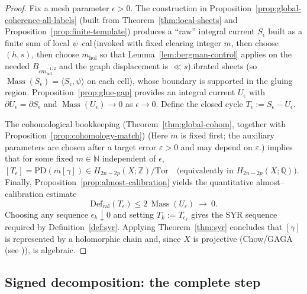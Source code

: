 \documentclass[11pt]{article}
\newcommand{\REV}[1]{\textcolor{blue}{#1}}
\numberwithin{equation}{section}  %
\theoremstyle{plain}
\theoremstyle{definition}
\theoremstyle{remark}
\newcommand{\Z}{\mathbb{Z}}
\newcommand{\Q}{\mathbb{Q}}
\newcommand{\N}{\mathbb{N}}
\newcommand{\mhol}{m_{\mathrm{hol}}} %
\DeclareMathOperator{\Mass}{Mass}
\newcommand{\Def}{\mathrm{Def}}
\begin{document}
\begin{proof}
Fix a mesh parameter $\epsilon>0$.
The construction in Proposition~\ref{prop:global-coherence-all-labels} (built from Theorem~\ref{thm:local-sheets} and Proposition~\ref{prop:finite-template}) produces a ``raw'' integral current $S_\epsilon$
built as a finite sum of local $\psi$--cal{\,(invoked with fixed clearing integer $m$, then choose $(h,s)$, then choose $\mhol$ so that Lemma~\ref{lem:bergman-control} applies on the needed $B_{c\mhol^{-1/2}}$ and the graph displacement is $\ll s$).}ibrated sheets (so $\Mass(S_\epsilon)=\langle S_\epsilon,\psi\rangle$ on each cell),
whose boundary is supported in the gluing region.
Proposition~\ref{prop:glue-gap} provides an integral current $U_\epsilon$ with
\(
\partial U_\epsilon=\partial S_\epsilon
\)
and
\(
\Mass(U_\epsilon)\to 0
\)
as $\epsilon\to 0$.
Define the closed cycle
\(
T_\epsilon:=S_\epsilon-U_\epsilon.
\)

The cohomological bookkeeping (Theorem~\ref{thm:global-cohom}, together with Proposition~\ref{prop:cohomology-match})
(Here $m$ is fixed first; the auxiliary parameters are chosen after a target error $\varepsilon>0$ and may depend on $\varepsilon$.)
implies that for some fixed $m\in\N$ independent of $\epsilon$,
\(
[T_\epsilon]=\mathrm{PD}(m[\gamma])\in H_{2n-2p}(X;\Z)/\mathrm{Tor}\quad\text{(equivalently in }H_{2n-2p}(X;\Q)\text{)}.
\)
Finally, Proposition~\ref{prop:almost-calibration} yields the quantitative almost--calibration estimate
\[
\Def_{\mathrm{cal}}(T_\epsilon)\le 2\,\Mass(U_\epsilon)\ \longrightarrow\ 0.
\]
Choosing any sequence $\epsilon_k\downarrow 0$ and setting $T_k:=T_{\epsilon_k}$ gives the SYR sequence required by
Definition~\ref{def:syr}.
Applying Theorem~\ref{thm:syr} concludes that $[\gamma]$ is represented by a holomorphic chain and, since $X$ is projective (Chow/GAGA
 (see \REV{\cite{Hartshorne77,GH78,Serre56}})),
is algebraic.
\end{proof}






\subsection*{Signed decomposition: the complete step}
\end{document}
